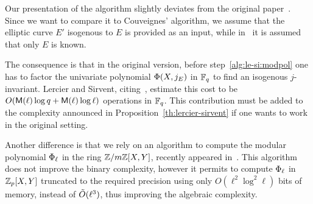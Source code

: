 \begin{remark}
  Our presentation of the algorithm slightly deviates from the
  original paper~\cite{lercier+sirvent08}. Since we want to compare it
  to Couveignes' algorithm, we assume that the elliptic curve $E'$
  isogenous to $E$ is provided as an input, while
  in~\cite{lercier+sirvent08} it is assumed that only $E$ is known.

  The consequence is that in the original version, before
  step~\ref{alg:le-si:modpol} one has to factor the univariate
  polynomial $\Phi(X,j_E)$ in $\mathbb{F}_q$ to find an isogenous
  $j$-invariant. Lercier and Sirvent,
  citing~\cite{lidl+niederreiter:2}, estimate this cost to be
  $O(\mathsf{M}(\ell)\log q + \mathsf{M}(\ell)\log\ell)$ operations in
  $\mathbb{F}_q$. This contribution must be added to the complexity announced
  in Proposition~\ref{th:lercier-sirvent} if one wants to work in the
  original setting.

  Another difference is that we rely on an algorithm to compute the
  modular polynomial $\Phi_\ell$ in the ring $\mathbb{Z}/m\mathbb{Z}[X,Y]$,
  recently appeared in~\cite{sutherland10:modpol}. This algorithm does
  not improve the binary complexity, however it permits to compute
  $\Phi_\ell$ in $\mathbb{Z}_p[X,Y]$ truncated to the required precision
  using only $O(\ell^2\log^2\ell)$ bits of memory, instead of
  $\tilde{O}(\ell^3)$, thus improving the algebraic complexity.
\end{remark}


